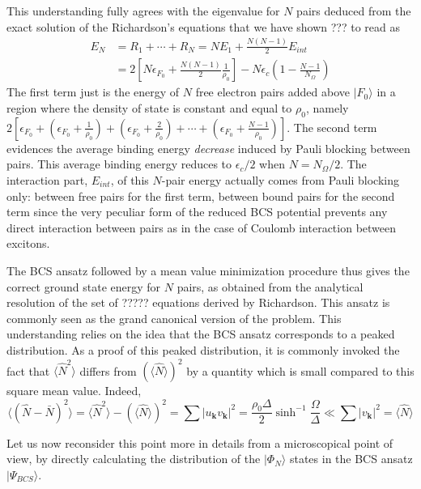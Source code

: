 \documentclass[aps,prb,preprint,groupedaddress,amsmath]{revtex4-1}
\newcommand{\vk}{\ensuremath{\mathbf{k}}}
\begin{document}
This understanding fully agrees with the  eigenvalue for $N$ pairs deduced from the exact solution of the Richardson's equations that we have shown ??? to read as
\begin{equation}
\begin{split}
E_N&=R_1+\cdots+R_N=NE_1+\frac{N(N-1)}2E_{int}\\
&=2\left[N\epsilon_{F_0}+\frac{N(N-1)}2\frac{1}{\rho_0}\right]-N\epsilon_c(1-\frac{N-1}{N_\Omega})
\end{split}
\end{equation}
The first term just is the energy of $N$ free electron pairs added above $|F_0{\rangle}$ in a region where the density of state is constant and equal to $\rho_0$, namely $2[\epsilon_{F_0}+(\epsilon_{F_0}+\frac{1}{\rho_0})+(\epsilon_{F_0}+\frac{2}{\rho_0})+\cdots+(\epsilon_{F_0}+\frac{N-1}{\rho_0})]$.  The second term evidences the average binding energy \emph{decrease} {induced} by Pauli blocking between pairs.    This average binding energy reduces to $\epsilon_c/2$ when $N=N_{\Omega}/2$.  The interaction part, $E_{int}$, of this $N$-pair energy actually comes from Pauli blocking only: between free pairs for the first term, between bound pairs for the second term since the very peculiar form of the reduced BCS potential prevents any direct interaction between pairs as in the case of Coulomb interaction between excitons.  

The BCS  ansatz followed by a mean value minimization procedure thus  gives the correct ground state energy for $N$ pairs, as obtained from the analytical resolution of the set of ????? equations derived by Richardson. This ansatz is commonly seen as the grand canonical version of the problem. This understanding relies on the idea that the BCS ansatz corresponds to a peaked distribution. As a proof of this peaked distribution, it is commonly invoked the fact that $\langle\hat{N}^2\rangle$ differs from $(\langle\hat{N}\rangle)^2$ by a quantity which is small compared to this square mean value.  Indeed, 
\begin{equation}
 \langle(\hat{N}-\bar{N})^2\rangle=\langle\hat{N}^2\rangle-(\langle\hat{N}\rangle)^2=\sum{}|u_\vk{}v_\vk|^2=\frac{\rho_0\Delta}2\sinh^{-1}{\frac{\Omega}{\Delta}}\ll\sum{}|v_\vk|^2=\langle\hat{N}\rangle
\end{equation}


Let us now reconsider this point more in details from a microscopical point of view, by directly calculating the distribution of the $|\Phi_N\rangle$ states in the BCS ansatz $|\Psi_{BCS}\rangle$.  
\end{document}
